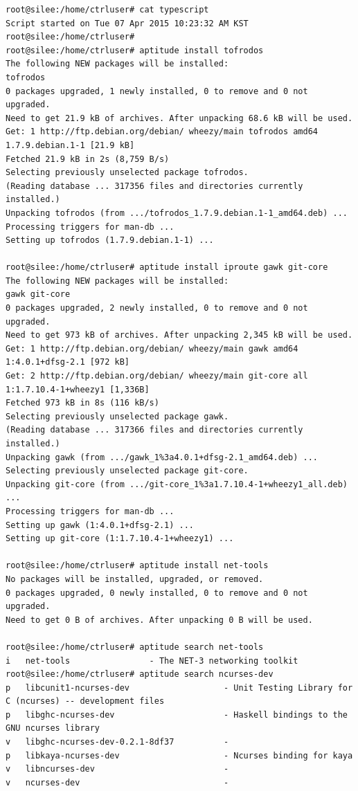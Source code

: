 \documentclass[11pt
  , a4paper
  , article
  , oneside
]{memoir}
\begin{document}
\begin{lstlisting}[style=termstyle]
root@silee:/home/ctrluser# cat typescript 
Script started on Tue 07 Apr 2015 10:23:32 AM KST
root@silee:/home/ctrluser# 
root@silee:/home/ctrluser# aptitude install tofrodos
The following NEW packages will be installed:
tofrodos 
0 packages upgraded, 1 newly installed, 0 to remove and 0 not upgraded.
Need to get 21.9 kB of archives. After unpacking 68.6 kB will be used.
Get: 1 http://ftp.debian.org/debian/ wheezy/main tofrodos amd64 1.7.9.debian.1-1 [21.9 kB]
Fetched 21.9 kB in 2s (8,759 B/s)   
Selecting previously unselected package tofrodos.
(Reading database ... 317356 files and directories currently installed.)
Unpacking tofrodos (from .../tofrodos_1.7.9.debian.1-1_amd64.deb) ...
Processing triggers for man-db ...
Setting up tofrodos (1.7.9.debian.1-1) ...

root@silee:/home/ctrluser# aptitude install iproute gawk git-core
The following NEW packages will be installed:
gawk git-core 
0 packages upgraded, 2 newly installed, 0 to remove and 0 not upgraded.
Need to get 973 kB of archives. After unpacking 2,345 kB will be used.
Get: 1 http://ftp.debian.org/debian/ wheezy/main gawk amd64 1:4.0.1+dfsg-2.1 [972 kB]
Get: 2 http://ftp.debian.org/debian/ wheezy/main git-core all 1:1.7.10.4-1+wheezy1 [1,336B]
Fetched 973 kB in 8s (116 kB/s)
Selecting previously unselected package gawk.
(Reading database ... 317366 files and directories currently installed.)
Unpacking gawk (from .../gawk_1%3a4.0.1+dfsg-2.1_amd64.deb) ...
Selecting previously unselected package git-core.
Unpacking git-core (from .../git-core_1%3a1.7.10.4-1+wheezy1_all.deb) ...
Processing triggers for man-db ...
Setting up gawk (1:4.0.1+dfsg-2.1) ...
Setting up git-core (1:1.7.10.4-1+wheezy1) ...

root@silee:/home/ctrluser# aptitude install net-tools
No packages will be installed, upgraded, or removed.
0 packages upgraded, 0 newly installed, 0 to remove and 0 not upgraded.
Need to get 0 B of archives. After unpacking 0 B will be used.

root@silee:/home/ctrluser# aptitude search net-tools
i   net-tools                - The NET-3 networking toolkit                                       
root@silee:/home/ctrluser# aptitude search ncurses-dev
p   libcunit1-ncurses-dev                   - Unit Testing Library for C (ncurses) -- development files          
p   libghc-ncurses-dev                      - Haskell bindings to the GNU ncurses library                        
v   libghc-ncurses-dev-0.2.1-8df37    		-                                                                    
p   libkaya-ncurses-dev                     - Ncurses binding for kaya                                           
v   libncurses-dev    						-      
v   ncurses-dev       						-
                                                                    

\end{lstlisting}
\end{document}
